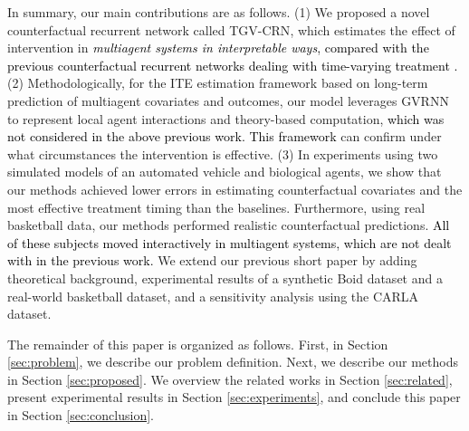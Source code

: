 \documentclass[journal]{IEEEtran}
\newcommand{\modelnospace}{{TGV-CRN}}
\begin{document}
In summary, our main contributions are as follows.
(1) We proposed a novel counterfactual recurrent network called \modelnospace, which estimates the effect of intervention in \textcolor{black}{\textit{multiagent systems in interpretable ways}, compared with the previous counterfactual recurrent networks dealing with time-varying treatment \cite{lim2018forecasting, bica2020estimating,bica2020time,liu2020estimating,ma2021deconfounding}.} 
(2) Methodologically, for the ITE estimation framework based on long-term prediction of multiagent covariates and outcomes, our model leverages GVRNN to represent local agent interactions and theory-based computation, \textcolor{black}{which was not considered in the above previous work. This framework} can confirm under what circumstances the intervention is effective.
(3) In experiments using two simulated models of an automated vehicle and biological agents, we show that our methods achieved lower errors in estimating counterfactual covariates and the most effective treatment timing than the baselines. Furthermore, using real basketball data, our methods performed realistic counterfactual predictions.
\textcolor{black}{All of these subjects moved interactively in multiagent systems, which are not dealt with in the previous work.}
We extend our previous short paper \cite{fujii2022estimating} by adding theoretical background, experimental results of a synthetic Boid dataset and a real-world basketball dataset, and a sensitivity analysis using the CARLA dataset.   

The remainder of this paper is organized as follows. First, in Section \ref{sec:problem}, we describe our problem definition. Next, we describe our methods in Section \ref{sec:proposed}.
We overview the related works in Section \ref{sec:related}, present experimental results in Section \ref{sec:experiments}, and conclude this paper in Section \ref{sec:conclusion}.
\end{document}
